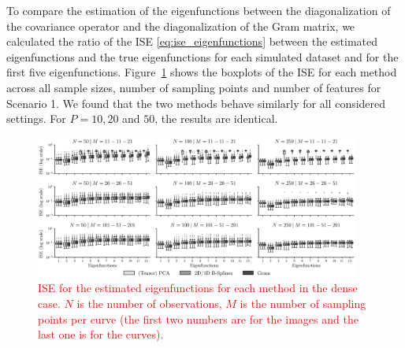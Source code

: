 \begin{results}
To compare the estimation of the eigenfunctions between the diagonalization of the covariance operator and the diagonalization of the Gram matrix, we calculated the ratio of the ISE \eqref{eq:ise_eigenfunctions} between the estimated eigenfunctions and the true eigenfunctions for each simulated dataset and for the first five eigenfunctions.
Figure~\ref{fig:ise_mfd_1d} shows the boxplots of the ISE for each method across all sample sizes, number of sampling points and number of features for Scenario 1. We found that the two methods behave similarly for all considered settings. For $P = 10, 20$ and $50$, the results are identical.
\begin{figure}
     \centering
    \includegraphics[width=0.95\textwidth]{figures/ISE.eps}
    \caption{\textcolor{red}{ISE for the estimated eigenfunctions for each method in the dense case. $N$ is the number of observations, $M$ is the number of sampling points per curve (the first two numbers are for the images and the last one is for the curves).}}
    \label{fig:ise_mfd_1d}
\end{figure}
\end{results}

